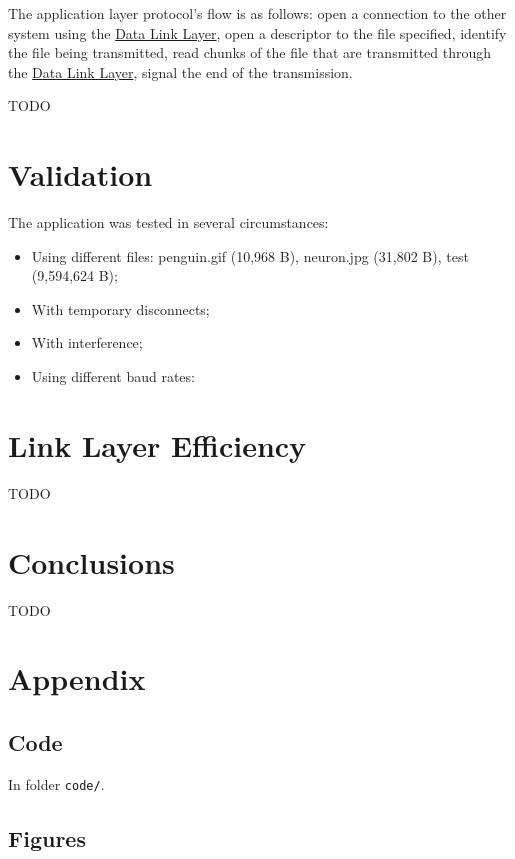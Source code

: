 \documentclass[11pt,a4paper,twocolumn]{article}
\begin{document}
The application layer protocol's flow is as follows:
open a connection to the other system using the \hyperref[sec:dll]{Data Link Layer},
open a descriptor to the file specified,
identify the file being transmitted,
read chunks of the file that are transmitted through the \hyperref[sec:dll]{Data Link Layer},
signal the end of the transmission.

TODO

\section{Validation}

The application was tested in several circumstances:

\begin{itemize}
    \item Using different files: penguin.gif (10,968 B), neuron.jpg (31,802 B), test (9,594,624 B);
    \item With temporary disconnects;
    \item With interference;
    \item Using different baud rates: 
\end{itemize}

\section{Link Layer Efficiency}

TODO

\section{Conclusions}

TODO

\pagebreak
\onecolumn
\appendix
\section{Appendix}

\subsection{Code}

\noindent In folder \lstinline{code/}.

\subsection{Figures}

\end{document}
